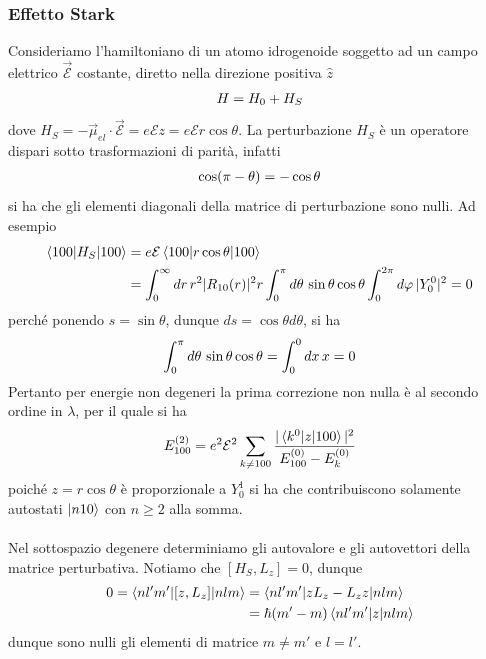 \documentclass{article}
\begin{document}
\subsubsection{Effetto Stark}
Consideriamo l'hamiltoniano di un atomo idrogenoide soggetto ad un campo elettrico $\vec{\mathcal{E}}$ costante, diretto nella direzione positiva $\hat{z}$
\begin{gather}
    H = H_0 + H_S \notag
\end{gather}
dove $H_S = -\vec{\mu}_{el} \cdot \vec{\mathcal{E}} = e\mathcal{E}z = e\mathcal{E}r\cos\theta$. La perturbazione $H_S$ è un operatore dispari sotto trasformazioni di parità, infatti
\begin{gather}
    \cos(\pi - \theta) = -\cos\theta \notag
\end{gather}
si ha che gli elementi diagonali della matrice di perturbazione sono nulli. Ad esempio
\begin{align}
    \braket{100|H_S|100} &= e\mathcal{E}\braket{100|r\cos\theta|100} \notag \\
    &= \int_0^\infty dr \, r^2|R_{10}(r)|^2r \int_0^\pi d\theta \, \sin\theta\cos\theta \int_0^{2\pi} d\varphi \, |Y^0_0|^2 \notag = 0
\end{align}
perché ponendo $s = \sin\theta$, dunque $ds = \cos\theta d\theta$, si ha
\begin{gather}
    \int_0^\pi d\theta \, \sin\theta\cos\theta = \int_0^0 dx \, x = 0 \notag
\end{gather}
Pertanto per energie non degeneri la prima correzione non nulla è al secondo ordine in $\lambda$, per il quale si ha
\begin{align}
    E_{100}^{(2)} = e^2\mathcal{E}^2\sum_{k \neq 100} \frac{|\braket{k^0|z|100}|^2}{E_{100}^{(0)} - E_k^{(0)}} \notag
\end{align}
poiché $z = r\cos\theta$ è proporzionale a $Y^1_0$ si ha che contribuiscono solamente autostati $\ket{n10}$ con $n \geq 2$ alla somma. \\ \\
Nel sottospazio degenere determiniamo gli autovalore e gli autovettori della matrice perturbativa. Notiamo che $[H_S, L_z] = 0$, dunque
\begin{align}
    0 = \braket{nl'm'|[z, L_z]|nlm} &= \braket{nl'm'|zL_z - L_zz|nlm} \notag \\
    &= \hbar(m' - m)\braket{nl'm'|z|nlm} \notag
\end{align}
dunque sono nulli gli elementi di matrice $m \neq m'$ e $l = l'$.
\end{document}
